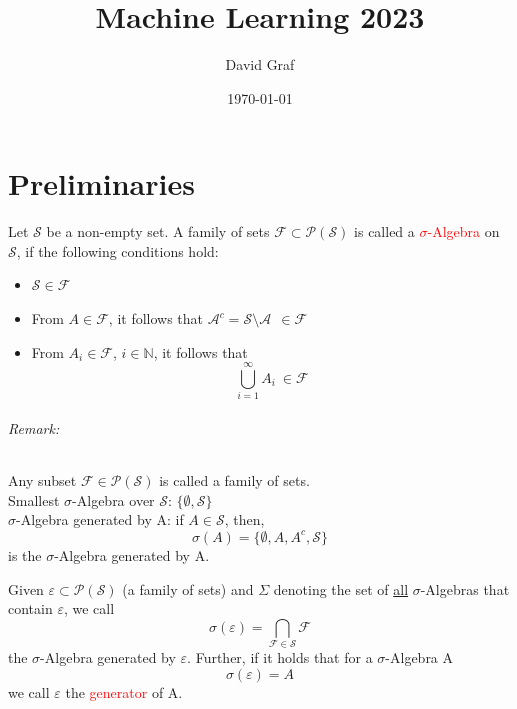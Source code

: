\documentclass[10pt,a4paper]{article}
\title{Machine Learning 2023}
\author{David Graf}
\date{\today}
\theoremstyle{definition}
\theoremstyle{plain}
\begin{document}
\maketitle
\part{Preliminaries}
\begin{boxeddef}
	Let $\mathcal{S}$ be a non-empty set. A family of sets $\mathcal{F} \subset \mathcal{P}(\mathcal{S})$ is called a \textcolor{red}{$\sigma$-Algebra} on $\mathcal{S}$, if the following conditions hold:
	\begin{itemize}
		\item $\mathcal{S} \in \mathcal{F}$
		\item From $ A \in \mathcal{F}$, it follows that $\mathcal{A}^c = \mathcal{S} \setminus \mathcal{A} \ \ \in \mathcal{F}$
		\item From $ A_i \in \mathcal{F}$, $i \in \mathbb{N}$, it follows that $$
			\bigcup_{i=1}^{\infty} A_i \  \in \mathcal{F}$$
	\end{itemize}
\end{boxeddef}

\paragraph{Remark:} Any subset $\mathcal{F} \in \mathcal{P}(\mathcal{S})$ is called a family of sets.\\

Smallest $\sigma$-Algebra over $\mathcal{S}$: $\{\emptyset, \mathcal{S}\}$\\

$\sigma$-Algebra generated by A: if $A \in \mathcal{S}$, then,$$
\sigma(A) = \{\emptyset, A, A^c, \mathcal{S}\}
$$
is the $\sigma$-Algebra generated by A.\\

\begin{boxeddef}[Generator]
	\label{generator}
	Given $\varepsilon \subset \mathcal{P}(\mathcal{S})$ (a family of sets) and $\Sigma$ denoting the set of \underline{all} $\sigma$-Algebras that contain $\varepsilon$, we call\\
	$$\sigma(\varepsilon) = \bigcap_{\mathcal{F} \in \mathcal{S}} \mathcal{F}$$
	the $\sigma$-Algebra generated by $\varepsilon$. Further, if it holds that for a $\sigma$-Algebra A\\
	$$\sigma(\varepsilon) = A$$
	we call $\varepsilon$ the \textcolor{red}{generator} of A.	
\end{boxeddef}
\end{document}
